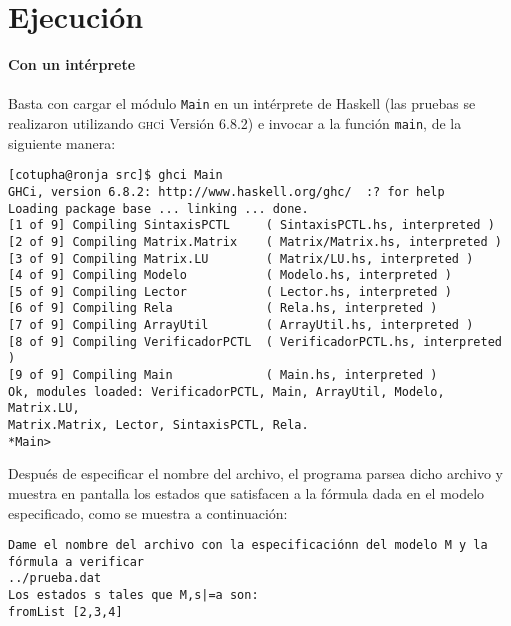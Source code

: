 \documentclass[12pt,letterpaper,spanish]{article}
\begin{document}
\section{Ejecución}

\textbf{Con un intérprete}
\\\\
Basta con cargar el módulo \texttt{Main} en un intérprete de Haskell (las
pruebas se realizaron utilizando \textsc{ghc}i Versión 6.8.2) e invocar a la función
\texttt{main}, de la siguiente manera:
\begin{verbatim}
[cotupha@ronja src]$ ghci Main
GHCi, version 6.8.2: http://www.haskell.org/ghc/  :? for help
Loading package base ... linking ... done.
[1 of 9] Compiling SintaxisPCTL     ( SintaxisPCTL.hs, interpreted )
[2 of 9] Compiling Matrix.Matrix    ( Matrix/Matrix.hs, interpreted )
[3 of 9] Compiling Matrix.LU        ( Matrix/LU.hs, interpreted )
[4 of 9] Compiling Modelo           ( Modelo.hs, interpreted )
[5 of 9] Compiling Lector           ( Lector.hs, interpreted )
[6 of 9] Compiling Rela             ( Rela.hs, interpreted )
[7 of 9] Compiling ArrayUtil        ( ArrayUtil.hs, interpreted )
[8 of 9] Compiling VerificadorPCTL  ( VerificadorPCTL.hs, interpreted )
[9 of 9] Compiling Main             ( Main.hs, interpreted )
Ok, modules loaded: VerificadorPCTL, Main, ArrayUtil, Modelo, Matrix.LU,
Matrix.Matrix, Lector, SintaxisPCTL, Rela.
*Main>  
\end{verbatim}
Después de especificar el nombre del archivo, el programa parsea dicho archivo y muestra en pantalla
los estados que satisfacen a la fórmula dada en el modelo especificado, como se muestra a continuación:
\begin{verbatim}
Dame el nombre del archivo con la especificaciónn del modelo M y la
fórmula a verificar
../prueba.dat
Los estados s tales que M,s|=a son:
fromList [2,3,4]
\end{verbatim}
\end{document}
